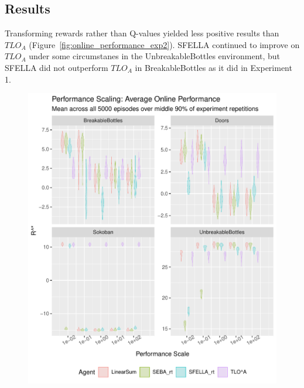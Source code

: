 \subsection{Results}

Transforming rewards rather than Q-values yielded less positive results than $TLO_A$ (Figure~\ref{fig:online_performance_exp2}). SFELLA continued to improve on $TLO_A$ under some circumstanes in the UnbreakableBottles environment, but SFELLA did not outperform $TLO_A$ in BreakableBottles as it did in Experiment 1. 

\begin{figure}
  \includegraphics[width=\columnwidth]{output/multirun_n100_reward_to_util_transformonline_util_transform_Performance.pdf}

\end{figure}
